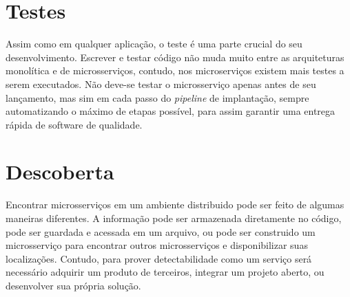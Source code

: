 \section{Testes}

Assim como em qualquer aplicação, o teste é uma parte crucial do seu desenvolvimento. Escrever e testar código não muda muito entre as arquiteturas monolítica e de microsserviços, contudo, nos microserviços existem mais testes a serem executados. Não deve-se testar o microsserviço apenas antes de seu lançamento, mas sim em cada passo do \emph{pipeline} de implantação, sempre automatizando o máximo de etapas possível, para assim garantir uma entrega rápida de software de qualidade. \cite{Familiar2015}

\section{Descoberta}

Encontrar microsserviços em um ambiente distribuido pode ser feito de algumas maneiras diferentes. A informação pode ser armazenada diretamente no código, pode ser guardada e acessada em um arquivo, ou pode ser construido um microsserviço para encontrar outros microsserviços e disponibilizar suas localizações. Contudo, para prover detectabilidade como um serviço será necessário adquirir um produto de terceiros, integrar um projeto aberto, ou desenvolver sua própria solução. \cite{Familiar2015}
